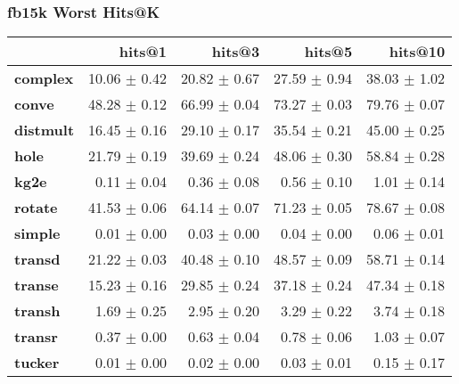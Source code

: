 \documentclass{article}
\begin{document}
\subsubsection{fb15k Worst Hits@K}
    \begin{center}
    \begin{tabular}{lrrrr}
\toprule
{} &        hits@1 &        hits@3 &        hits@5 &       hits@10 \\
\midrule
\textbf{complex } &  10.06 $\pm$ 0.42 &  20.82 $\pm$ 0.67 &  27.59 $\pm$ 0.94 &  38.03 $\pm$ 1.02 \\
\textbf{conve   } &  48.28 $\pm$ 0.12 &  66.99 $\pm$ 0.04 &  73.27 $\pm$ 0.03 &  79.76 $\pm$ 0.07 \\
\textbf{distmult} &  16.45 $\pm$ 0.16 &  29.10 $\pm$ 0.17 &  35.54 $\pm$ 0.21 &  45.00 $\pm$ 0.25 \\
\textbf{hole    } &  21.79 $\pm$ 0.19 &  39.69 $\pm$ 0.24 &  48.06 $\pm$ 0.30 &  58.84 $\pm$ 0.28 \\
\textbf{kg2e    } &   0.11 $\pm$ 0.04 &   0.36 $\pm$ 0.08 &   0.56 $\pm$ 0.10 &   1.01 $\pm$ 0.14 \\
\textbf{rotate  } &  41.53 $\pm$ 0.06 &  64.14 $\pm$ 0.07 &  71.23 $\pm$ 0.05 &  78.67 $\pm$ 0.08 \\
\textbf{simple  } &   0.01 $\pm$ 0.00 &   0.03 $\pm$ 0.00 &   0.04 $\pm$ 0.00 &   0.06 $\pm$ 0.01 \\
\textbf{transd  } &  21.22 $\pm$ 0.03 &  40.48 $\pm$ 0.10 &  48.57 $\pm$ 0.09 &  58.71 $\pm$ 0.14 \\
\textbf{transe  } &  15.23 $\pm$ 0.16 &  29.85 $\pm$ 0.24 &  37.18 $\pm$ 0.24 &  47.34 $\pm$ 0.18 \\
\textbf{transh  } &   1.69 $\pm$ 0.25 &   2.95 $\pm$ 0.20 &   3.29 $\pm$ 0.22 &   3.74 $\pm$ 0.18 \\
\textbf{transr  } &   0.37 $\pm$ 0.00 &   0.63 $\pm$ 0.04 &   0.78 $\pm$ 0.06 &   1.03 $\pm$ 0.07 \\
\textbf{tucker  } &   0.01 $\pm$ 0.00 &   0.02 $\pm$ 0.00 &   0.03 $\pm$ 0.01 &   0.15 $\pm$ 0.17 \\
\bottomrule
\end{tabular}

    \end{center}
\end{document}
